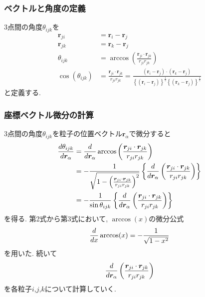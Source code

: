 \subsubsection{ベクトルと角度の定義}
3点間の角度$\theta_{ijk}$を
\begin{align}
   \bm{r}_{ji}
&= \bm{r}_{i} - \bm{r}_{j}
\\
   \bm{r}_{jk}
&= \bm{r}_{k} - \bm{r}_{j}
\\
   \theta_{ijk}
&= \arccos \left( \frac{\bm{r}_{ji} \cdot \bm{r}_{jk}}{r_{ji} r_{jk}} \right)
\\
   \cos(\theta_{ijk})
&= \frac{\bm{r}_{ji} \cdot \bm{r}_{jk}}{r_{ji} r_{jk}}
 = \frac{(\bm{r}_{i} - \bm{r}_{j}) \cdot (\bm{r}_{k} - \bm{r}_{j})}
        {\left\{(\bm{r}_{i} - \bm{r}_{j})\right\}^{\frac{1}{2}}
         \left\{(\bm{r}_{k} - \bm{r}_{j})\right\}^{\frac{1}{2}}}
\end{align}
と定義する.

\subsubsection{座標ベクトル微分の計算}
3点間の角度$\theta_{ijk}$を粒子の位置ベクトル$\bm{r}_{\alpha}$で微分すると
\begin{align}
    \frac{d \theta_{ijk}}{d \bm{r}_{\alpha}}
 &=
    \frac{d}{d \bm{r}_{\alpha}}
    \arccos \left( \frac{\bm{r}_{ji} \cdot \bm{r}_{jk}}{r_{ji} r_{jk}} \right)
 \notag \\
 &=
   -\frac{1}
         {\sqrt{1- \left(\frac{\bm{r}_{ji} \cdot \bm{r}_{jk}}{r_{ji} r_{jk}}\right)^{2}}}
    \left\{
            \frac{d}{d \bm{r}_{\alpha}}
            \left(\frac{\bm{r}_{ji} \cdot \bm{r}_{jk}}{r_{ji} r_{jk}}\right)
    \right\}
 \notag \\
 &=
   -\frac{1}{\sin\theta_{ijk}}
    \left\{
            \frac{d}{d \bm{r}_{\alpha}}
            \left(\frac{\bm{r}_{ji} \cdot \bm{r}_{jk}}{r_{ji} r_{jk}}\right)
    \right\}
  \notag
\end{align}
を得る. 第2式から第3式において, $\arccos(x)$の微分公式
\begin{equation}
\frac{d}{dx}\arccos(x) = - \frac{1}{\sqrt{1-x^2}}
\notag
\end{equation}
を用いた. 続いて
\begin{equation}
 \frac{d}{d \bm{r}_{\alpha}}
 \left(\frac{\bm{r}_{ji} \cdot \bm{r}_{jk}}{r_{ji} r_{jk}}\right)
 \notag
\end{equation}
を各粒子$i$,$j$,$k$について計算していく.

